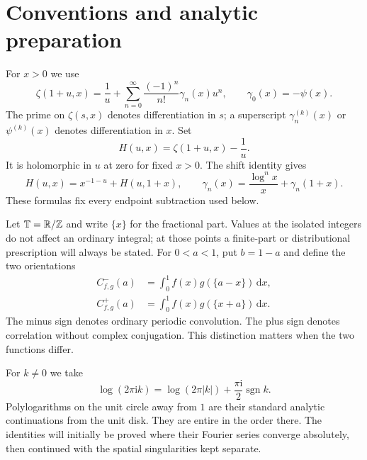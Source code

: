 \documentclass[11pt]{article}
\numberwithin{equation}{section}
\theoremstyle{definition}\newtheorem{definition}[theorem]{Definition}
\theoremstyle{remark}\newtheorem{remark}[theorem]{Remark}
\newcommand{\dd}{\,\mathrm d}
\newcommand{\iu}{\mathrm i}
\newcommand{\R}{\mathbb R}\newcommand{\C}{\mathbb C}
\begin{document}
\section{Conventions and analytic preparation}
\label{sec:conventions}

For $x>0$ we use
\begin{equation}\label{eq:laurent}
 \zeta(1+u,x)=\frac1u+
 \sum_{n=0}^{\infty}\frac{(-1)^n}{n!}\gamma_n(x)u^n,
 \qquad \gamma_0(x)=-\psi(x).
\end{equation}
The prime on $\zeta(s,x)$ denotes differentiation in $s$; a superscript
$\gamma_n^{(k)}(x)$ or $\psi^{(k)}(x)$ denotes differentiation in $x$.
Set
\begin{equation}\label{eq:H}
 H(u,x)=\zeta(1+u,x)-\frac1u.
\end{equation}
It is holomorphic in $u$ at zero for fixed $x>0$. The shift identity gives
\begin{equation}\label{eq:localH}
 H(u,x)=x^{-1-u}+H(u,1+x),\qquad
 \gamma_n(x)=\frac{\log^n x}{x}+\gamma_n(1+x).
\end{equation}
These formulas fix every endpoint subtraction used below.

Let $\T=\R/\Z$ and write $\{x\}$ for the fractional part. Values at the
isolated integers do not affect an ordinary integral; at those points a
finite-part or distributional prescription will always be stated. For
$0<a<1$, put $b=1-a$ and define the two orientations
\begin{align}
 C^-_{f,g}(a)&=\int_0^1 f(x)g(\{a-x\})\dd x,
       \label{eq:minusdef}\\
 C^+_{f,g}(a)&=\int_0^1 f(x)g(\{x+a\})\dd x.
       \label{eq:plusdef}
\end{align}
The minus sign denotes ordinary periodic convolution. The plus sign
denotes correlation without complex conjugation. This distinction matters
when the two functions differ.

For $k\ne0$ we take
\begin{equation}\label{eq:logbranch}
 \log(2\pi\iu k)=\log(2\pi|k|)
                   +\frac{\pi\iu}{2}\operatorname{sgn}k.
\end{equation}
Polylogarithms on the unit circle away from $1$ are their standard
analytic continuations from the unit disk. They are entire in the order
there. The identities will initially be proved where their Fourier series
converge absolutely, then continued with the spatial singularities kept
separate.
\end{document}
